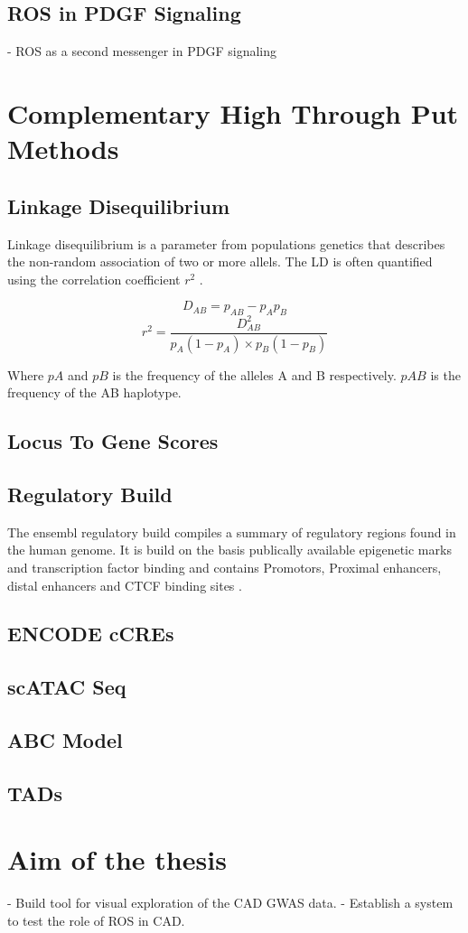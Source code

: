     \subsection{ROS in PDGF Signaling}
    \label{subsec:ROS_signaling}
    - ROS as a second messenger in PDGF signaling

\section{Complementary High Through Put Methods}
\label{sec:bioinformatics}

    \subsection{Linkage Disequilibrium}
    Linkage disequilibrium is a parameter from populations genetics that describes the non-random association of two or more allels. The LD is often quantified using the correlation coefficient $r^2$ \cite{slatkinLinkageDisequilibriumUnderstanding2008}.

    $$ D_{AB} = p_{AB} − p_A p_B $$
    $$ r^2 = \frac{D_{AB}^2}{p_A (1-p_A) \times p_B (1-p_B)} $$

    Where $pA$ and $pB$ is the frequency of the alleles A and B respectively. $pAB$ is the frequency of the AB haplotype.

    \subsection{Locus To Gene Scores}

    \subsection{Regulatory Build}
    The ensembl regulatory build compiles a summary of regulatory regions found in the human genome. It is build on the basis publically available epigenetic marks and transcription factor binding and contains Promotors, Proximal enhancers, distal enhancers and CTCF binding sites \cite{zerbinoEnsemblRegulatoryBuild2015}.

    \subsection{ENCODE cCREs}

    \subsection{scATAC Seq}

    \subsection{ABC Model}

    \subsection{TADs}

\section{Aim of the thesis}
\label{sec:Aim}
- Build tool for visual exploration of the CAD GWAS data.
- Establish a system to test the role of ROS in CAD.
